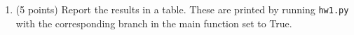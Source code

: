 \documentclass{article}
\begin{document}
\begin{enumerate}
\begin{Q}
\begin{enumerate}
  \item (5 points) Report the results in a table. These are printed by running \texttt{hw1.py} with the corresponding branch in the main function set to True. 
\end{enumerate}
  
\end{Q}

\end{enumerate}
 

% 
% 
\end{document}
